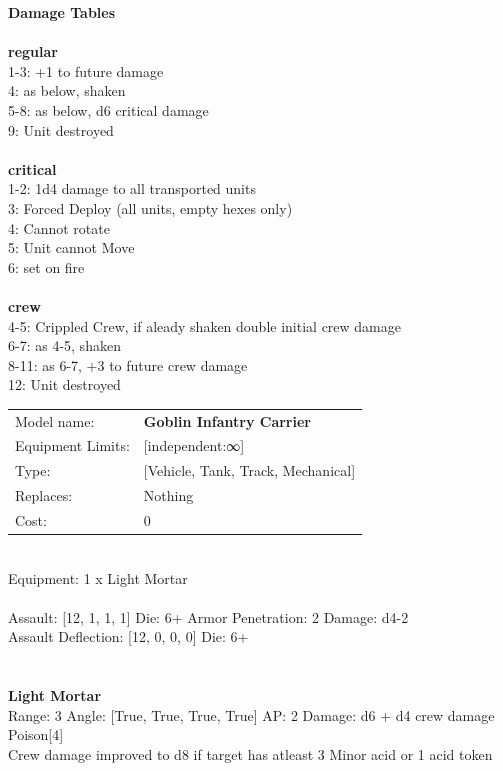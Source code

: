 {\bf Damage Tables} \\
\ \\ {\bf regular } \\
1-3: +1 to future damage \\
4: as below, shaken \\
5-8: as below, d6 critical damage \\
9: Unit destroyed \\
\ \\ {\bf critical } \\
1-2: 1d4 damage to all transported units \\
3: Forced Deploy (all units, empty hexes only) \\
4: Cannot rotate \\
5: Unit cannot Move  \\
6: set on fire \\
\ \\ {\bf crew } \\
4-5: Crippled Crew, if aleady shaken double initial crew damage \\
6-7: as 4-5, shaken \\
8-11: as 6-7, +3 to future crew damage \\
12: Unit destroyed \\


\noindent
\begin{tabular}{ll}
Model name: &{\bf Goblin Infantry Carrier } \\
Equipment Limits: &[independent:∞] \\
Type: &[Vehicle, Tank, Track, Mechanical] \\
Replaces: &Nothing \\
Cost: & 0\\
\end{tabular}
\ \\
Equipment: 1 x Light Mortar \\
\ \\
Assault: [12, 1, 1, 1] Die: 6+ Armor Penetration: 2 Damage: d4-2 \\
Assault Deflection: [12, 0, 0, 0] Die: 6+\\
\indent  
\ \\

\ \\
{\bf Light Mortar } \\



Range: 3  Angle: [True, True, True, True] AP: 2 Damage: d6 + d4 crew damage \\
Poison[4]\\ 
Crew damage improved to d8 if target has atleast 3 Minor acid or 1 acid token\\ 




